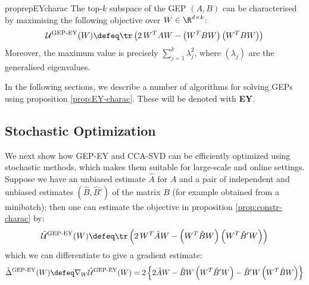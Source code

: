 \begin{restatable}{proprep}{EYcharac}
    \label{prop:EY-charac}
    The top-$k$ subspace of the GEP $(A,B)$ can be characterised by maximising the following objective over $W \in \R^{d \times k}$:
    \begin{align}
        \mathcal{U}^\text{GEP-EY}(W) \defeq \tr \left( 2\, W^T A W - \left(W^T B W\right) \left(W^T B W\right) \right)
    \end{align}
    Moreover, the maximum value is precisely $\sum_{j=1}^k \lambda_j^2$, where $(\lambda_j)$ are the generalised eigenvalues.
\end{restatable}



In the following sections, we describe a number of algorithms for solving GEPs using proposition \ref{prop:EY-charac}.
These will be denoted with \textbf{EY}.

\subsection{Stochastic Optimization}

We next show how GEP-EY and CCA-SVD can be efficiently optimized using stochastic methods, which makes them suitable for large-scale and online settings.
Suppose we have an unbiased estimate $\hat{A}$ for $A$ and a pair of independent and unbiased estimates $(\hat{B},\hat{B}')$ of the matrix $B$ (for example obtained from a minibatch); then one can estimate the objective in proposition \ref{prop:constr-charac} by:
\begin{align}
    \hat{\mathcal{U}}^\text{GEP-EY}(W) \defeq \tr \left( 2\, W^T \hat{A} W - \left(W^T \hat{B} W\right) \left(W^T \hat{B}' W\right) \right)
\end{align}
which we can differentiate to give a gradient estimate:
\begin{align}\label{eq:GEP-EY-grad}
    \hat{\Delta}^{\text{GEP-EY}}(W)
    \defeq \nabla_W \hat{\mathcal{U}}^\text{GEP-EY}(W)
    = 2 \left\{ 2 \hat{A} W - \hat{B} W \left(W^T \hat{B}' W \right) - \hat{B}' W \left(W^T \hat{B} W \right) \right\}
\end{align}

